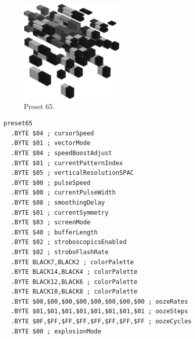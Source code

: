 \vspace*{-0.5cm}
\begin{minipage}[b]{0.48\linewidth}
\begin{figure}[H]                                                          
  \centering                                                             
  \begin{adjustbox}{width=5cm,center}                                   
  \includegraphics[width=5cm]{src/colorspace_presets/preset65-45.png}%
  \end{adjustbox}                                                        
\caption*{Preset 65.}                                           
\end{figure}                                                               
\end{minipage}
\hspace{0.1cm}
\begin{minipage}[b]{0.48\linewidth}                                                                         
\begin{lstlisting}[basicstyle=\ttfamily\tiny]
preset65
  .BYTE $04 ; cursorSpeed
  .BYTE $01 ; vectorMode
  .BYTE $04 ; speedBoostAdjust
  .BYTE $01 ; currentPatternIndex
  .BYTE $05 ; verticalResolutionSPAC
  .BYTE $00 ; pulseSpeed
  .BYTE $00 ; currentPulseWidth
  .BYTE $08 ; smoothingDelay
  .BYTE $01 ; currentSymmetry
  .BYTE $03 ; screenMode
  .BYTE $40 ; bufferLength
  .BYTE $02 ; stroboscopicsEnabled
  .BYTE $02 ; stroboFlashRate
  .BYTE BLACK7,BLACK2 ; colorPalette
  .BYTE BLACK14,BLACK4 ; colorPalette
  .BYTE BLACK12,BLACK6 ; colorPalette
  .BYTE BLACK10,BLACK8 ; colorPalette
  .BYTE $00,$00,$00,$00,$00,$00,$00,$00 ; oozeRates
  .BYTE $01,$01,$01,$01,$01,$01,$01,$01 ; oozeSteps
  .BYTE $0F,$FF,$FF,$FF,$FF,$FF,$FF,$FF ; oozeCycles
  .BYTE $00 ; explosionMode
\end{lstlisting}
\end{minipage}



